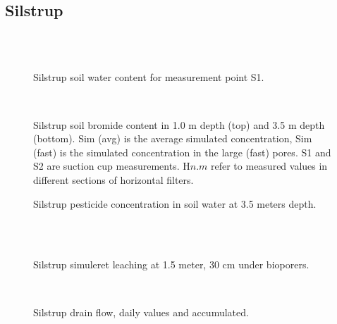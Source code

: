 \subsection*{Silstrup}

\begin{figure}[htbp]
  \begin{center}
    \\
    \\
  \end{center}
  \caption{Silstrup soil water content for measurement point S1.}
  \label{fig:Silstrup-theta}
\end{figure}\FloatBarrier

\begin{figure}[htbp]
  \begin{center}
    \\
  \end{center}
  \caption{Silstrup soil bromide content in 1.0 m depth (top) and 3.5
    m depth (bottom).  Sim (avg) is the average simulated
    concentration, Sim (fast) is the simulated concentration in the
    large (fast) pores.  S1 and S2 are suction cup measurements.
    H$n$.$m$ refer to measured values in different sections of
    horizontal filters.}
  \label{fig:Silstrup-bromide}
\end{figure}\FloatBarrier

\begin{figure}[htbp]
  \begin{center}
  \end{center}
  \caption{Silstrup pesticide concentration in soil water at 3.5 meters depth.}
  \label{fig:Silstrup-horizontal}
\end{figure}\FloatBarrier

\begin{figure}[htbp]
  \begin{center}
    \\
    \\
  \end{center}
  \caption{Silstrup simuleret leaching at 1.5 meter, 30 cm under bioporers.}
  \label{fig:Silstrup-leak150}
\end{figure}\FloatBarrier

\begin{figure}[htbp]
  \begin{center}
    \\
  \end{center}
  \caption{Silstrup drain flow, daily values and accumulated.}
  \label{fig:Silstrup-drain}
\end{figure}\FloatBarrier

